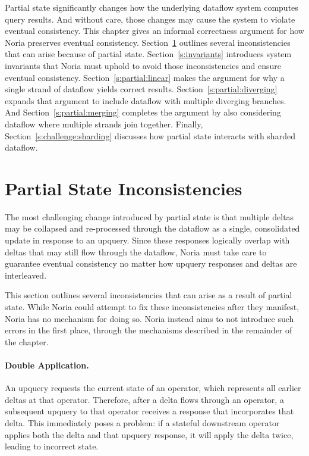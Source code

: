 Partial state significantly changes how the underlying dataflow system computes
query results. And without care, those changes may cause the system to violate
eventual consistency. This chapter gives an informal correctness argument for
how Noria preserves eventual consistency.
Section~\ref{s:partial:inconsistencies} outlines several inconsistencies that
can arise because of partial state. Section~\ref{s:invariants} introduces system
invariants that Noria must uphold to avoid those inconsistencies and ensure
eventual consistency. Section~\ref{s:partial:linear} makes the argument for why
a single strand of dataflow yields correct results.
Section~\ref{s:partial:diverging} expands that argument to include dataflow with
multiple diverging branches. And Section~\ref{s:partial:merging} completes the
argument by also considering dataflow where multiple strands join together.
Finally, Section~\ref{s:challenge:sharding} discusses how partial state
interacts with sharded dataflow.

\section{Partial State Inconsistencies}
\label{s:partial:inconsistencies}

The most challenging change introduced by partial state is that multiple deltas
may be collapsed and re-processed through the dataflow as a single, consolidated
update in response to an upquery. Since these responses logically overlap with
deltas that may still flow through the dataflow, Noria must take care to
guarantee eventual consistency no matter how upquery responses and deltas are
interleaved.

This section outlines several inconsistencies that can arise as a result of
partial state. While Noria could attempt to fix these inconsistencies after they
manifest, Noria has no mechanism for doing so. Noria instead aims to not
introduce such errors in the first place, through the mechanisms described in
the remainder of the chapter.

\paragraph{Double Application.}
An upquery requests the current state of an operator, which represents all
earlier deltas at that operator. Therefore, after a delta flows through an
operator, a subsequent upquery to that operator receives a response that
incorporates that delta. This immediately poses a problem: if a stateful
downstream operator applies both the delta and that upquery response, it will
apply the delta twice, leading to incorrect state.

